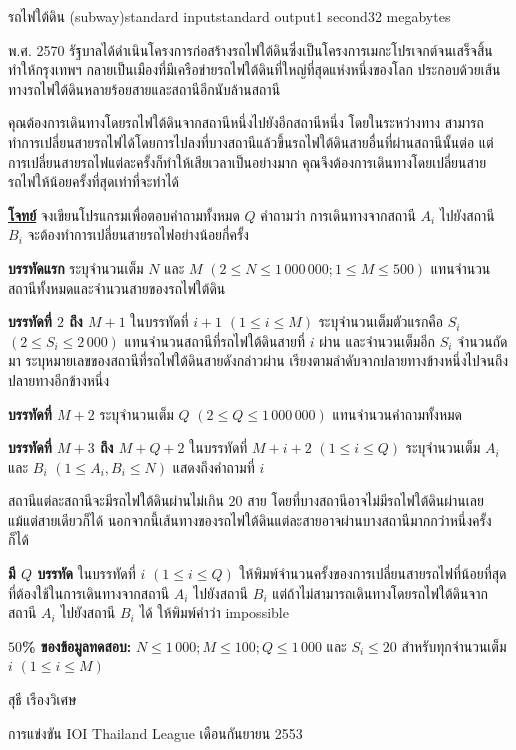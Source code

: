 \documentclass[11pt,a4paper]{article}
\begin{document}
\begin{problem}{รถไฟใต้ดิน (subway)}{standard input}{standard output}{1 second}{32 megabytes}

พ.ศ. 2570 รัฐบาลได้ดำเนินโครงการก่อสร้างรถไฟใต้ดินซึ่งเป็นโครงการเมกะโปรเจกต์จนเสร็จสิ้น ทำให้กรุงเทพฯ กลายเป็นเมืองที่มีเครือข่ายรถไฟใต้ดินที่ใหญ่ที่สุดแห่งหนึ่งของโลก ประกอบด้วยเส้นทางรถไฟใต้ดินหลายร้อยสายและสถานีอีกนับล้านสถานี

คุณต้องการเดินทางโดยรถไฟใต้ดินจากสถานีหนึ่งไปยังอีกสถานีหนึ่ง โดยในระหว่างทาง สามารถทำการเปลี่ยนสายรถไฟได้โดยการไปลงที่บางสถานีแล้วขึ้นรถไฟใต้ดินสายอื่นที่ผ่านสถานีนั้นต่อ แต่การเปลี่ยนสายรถไฟแต่ละครั้งก็ทำให้เสียเวลาเป็นอย่างมาก คุณจึงต้องการเดินทางโดยเปลี่ยนสายรถไฟให้น้อยครั้งที่สุดเท่าที่จะทำได้

\bigskip
\underline{\textbf{โจทย์}}  จงเขียนโปรแกรมเพื่อตอบคำถามทั้งหมด $Q$ คำถามว่า การเดินทางจากสถานี $A_i$ ไปยังสถานี $B_i$ จะต้องทำการเปลี่ยนสายรถไฟอย่างน้อยกี่ครั้ง


\InputFile

\textbf{บรรทัดแรก} ระบุจำนวนเต็ม $N$ และ $M$ $(2 \leq N \leq 1\,000\,000; 1 \leq M \leq 500)$ แทนจำนวนสถานีทั้งหมดและจำนวนสายของรถไฟใต้ดิน

\textbf{บรรทัดที่ $2$ ถึง $M+1$ }ในบรรทัดที่ $i+1$ $(1 \leq i \leq M)$ ระบุจำนวนเต็มตัวแรกคือ $S_i$ $(2 \leq S_i \leq 2\,000)$ แทนจำนวนสถานีที่รถไฟใต้ดินสายที่ $i$ ผ่าน และจำนวนเต็มอีก $S_i$ จำนวนถัดมา ระบุหมายเลขของสถานีที่รถไฟใต้ดินสายดังกล่าวผ่าน เรียงตามลำดับจากปลายทางข้างหนึ่งไปจนถึงปลายทางอีกข้างหนึ่ง

\textbf{บรรทัดที่ $M+2$} ระบุจำนวนเต็ม $Q$ $(2 \leq Q \leq 1\,000\,000)$ แทนจำนวนคำถามทั้งหมด

\textbf{บรรทัดที่ $M+3$ ถึง $M+Q+2$ } ในบรรทัดที่ $M+i+2$ $(1 \leq i \leq Q)$ ระบุจำนวนเต็ม $A_i$ และ $B_i$ $(1 \leq A_i,B_i \leq N)$ แสดงถึงคำถามที่ $i$

สถานีแต่ละสถานีจะมีรถไฟใต้ดินผ่านไม่เกิน $20$ สาย โดยที่บางสถานีอาจไม่มีรถไฟใต้ดินผ่านเลยแม้แต่สายเดียวก็ได้ นอกจากนี้เส้นทางของรถไฟใต้ดินแต่ละสายอาจผ่านบางสถานีมากกว่าหนึ่งครั้งก็ได้


\OutputFile

\textbf{มี $Q$ บรรทัด} ในบรรทัดที่ $i$ $(1 \leq i \leq Q)$ ให้พิมพ์จำนวนครั้งของการเปลี่ยนสายรถไฟที่น้อยที่สุดที่ต้องใช้ในการเดินทางจากสถานี $A_i$ ไปยังสถานี $B_i$ แต่ถ้าไม่สามารถเดินทางโดยรถไฟใต้ดินจากสถานี $A_i$ ไปยังสถานี $B_i$ ได้ ให้พิมพ์คำว่า impossible

\Examples

\begin{example}
%
%
\end{example}

\Scoring

\textbf{$50$\% ของข้อมูลทดสอบ:} $N \leq 1\,000; M \leq 100; Q \leq 1\,000$ และ $S_i \leq 20$ สำหรับทุกจำนวนเต็ม $i$ $(1 \leq i \leq M)$
  
\Source

สุธี เรืองวิเศษ

การแข่งขัน IOI Thailand League เดือนกันยายน 2553


\end{problem}
\end{document}
